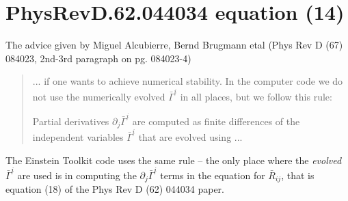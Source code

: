 \documentclass[12pt]{cdblatex}
\begin{document}
\section*{PhysRevD.62.044034 equation (14)}

The advice given by Miguel Alcubierre, Bernd Brugmann etal (Phys Rev D (67) 084023,
2nd-3rd paragraph on pg. 084023-4)

\begin{quote}
... if one wants to achieve numerical stability. In the computer code we do not use the numerically
evolved ${\bar{\Gamma}}^i$ in all places, but we follow this rule:

Partial derivatives $\partial_j {\bar{\Gamma}}^i$ are computed as finite differences
of the independent variables ${\bar{\Gamma}}^i$ that are evolved using ...
\end{quote}

The Einstein Toolkit code uses the same rule -- the only place where the \emph{evolved} ${\bar{\Gamma}}^i$
are used is in computing the $\partial_j {\bar{\Gamma}}^i$ terms in the equation
for ${\bar{R}}_{ij}$, that is equation (18) of the Phys Rev D (62) 044034 paper.

\clearpage
\end{document}
